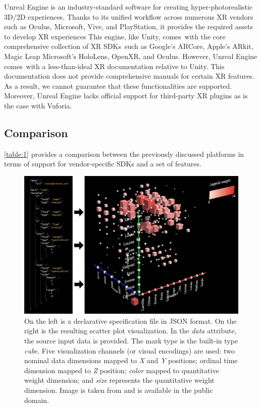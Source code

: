 \documentclass{vgtc}                          %
\begin{document}
Unreal Engine is an industry-standard software for creating
hyper-photorealistic 3D/2D experiences. Thanks to its unified workflow across
numerous XR vendors such as Oculus, Microsoft, Vive, and PlayStation, it
provides the required assets to develop XR experiences This engine, like Unity,
comes with the core comprehensive collection of XR SDKs such as Google's
ARCore, Apple's ARkit, Magic Leap Microsoft's HoloLens, OpenXR, and Oculus.
However, Unreal Engine comes with a  less-than-ideal XR documentation relative
to Unity. This documentation does not provide comprehensive manuals for certain
XR features. As a result, we cannot guarantee that these functionalities are
supported. Moreover, Unreal Engine lacks official support for third-party XR
plugins as is the case with Vuforia.
\subsection{Comparison}
\autoref{table:1} provides a comparison between the previously discussed
platforms in terms of support for vendor-specific SDKs and a set of features.

\begin{figure}[t!]
	\centering
	\includegraphics[width=\columnwidth]{dxr_toolkit_00}
    \caption{On the left is a declarative specification file in JSON format. On the right is the resulting
    scatter plot visualization. In the \textit{data} attribute, the source input data is provided. The mark
    type is the built-in type \textit{cube}. Five visualization channels (or visual encodings) are used:
    two nominal data dimensions mapped to \textit{X} and \textit{Y} positions; ordinal time dimension mapped
    to \textit{Z} position; \textit{color} mapped to quantitative weight dimension; and \textit{size}
    represents the quantitative weight dimension.
    Image is taken from \cite{dxr:repo} and is available in the public domain.}
    \label{fig:dxr_toolkit_00}
\end{figure}
\end{document}

